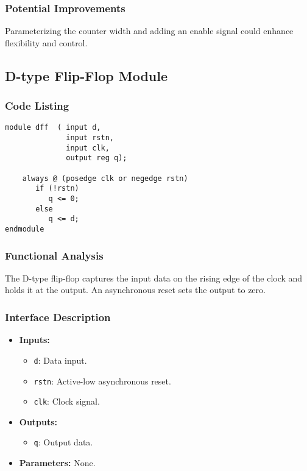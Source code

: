 \documentclass[10pt]{article}
\begin{document}
\subsubsection{Potential Improvements}
Parameterizing the counter width and adding an enable signal could enhance flexibility and control.

\subsection{D-type Flip-Flop Module}

\subsubsection{Code Listing}
\begin{verbatim}
module dff 	( input d,
              input rstn,
              input clk,
              output reg q);

	always @ (posedge clk or negedge rstn)
       if (!rstn)
          q <= 0;
       else
          q <= d;
endmodule
\end{verbatim}

\subsubsection{Functional Analysis}
The D-type flip-flop captures the input data on the rising edge of the clock and holds it at the output. An asynchronous reset sets the output to zero.

\subsubsection{Interface Description}
\begin{itemize}
    \item \textbf{Inputs:}
    \begin{itemize}
        \item \texttt{d}: Data input.
        \item \texttt{rstn}: Active-low asynchronous reset.
        \item \texttt{clk}: Clock signal.
    \end{itemize}
    \item \textbf{Outputs:}
    \begin{itemize}
        \item \texttt{q}: Output data.
    \end{itemize}
    \item \textbf{Parameters:} None.
\end{itemize}
\end{document}
